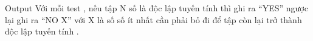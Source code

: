 Output
Với mỗi test , nếu tập N số là độc lập tuyến tính thì ghi ra “YES” ngược lại ghi ra “NO X” với X là số số ít nhất cần phải bỏ đi để tập còn lại trở thành độc lập tuyến tính .
